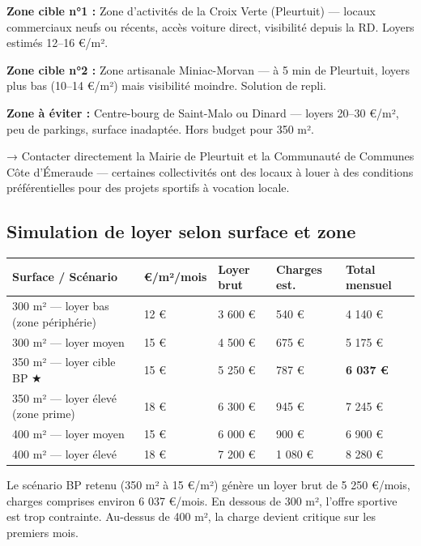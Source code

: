 \documentclass[11pt, a4paper]{article}
\newcommand{\redcell}[1]{\textcolor{fc-red}{\textbf{#1}}}
\newcommand{\posnum}[1]{\textcolor{green!60!black}{#1}}
\begin{document}
\textbf{Zone cible n°1 :} Zone d'activités de la Croix Verte (Pleurtuit) — locaux commerciaux neufs ou récents, accès voiture direct, visibilité depuis la RD. Loyers estimés 12–16 €/m².

\textbf{Zone cible n°2 :} Zone artisanale Miniac-Morvan — à 5 min de Pleurtuit, loyers plus bas (10–14 €/m²) mais visibilité moindre. Solution de repli.

\textbf{Zone à éviter :} Centre-bourg de Saint-Malo ou Dinard — loyers 20–30 €/m², peu de parkings, surface inadaptée. Hors budget pour 350 m².

\begin{tipbox}
→ Contacter directement la Mairie de Pleurtuit et la Communauté de Communes Côte d'Émeraude — certaines collectivités ont des locaux à louer à des conditions préférentielles pour des projets sportifs à vocation locale.
\end{tipbox}

\subsection{Simulation de loyer selon surface et zone}

\begin{center}
\begin{tabular}{@{}p{4.5cm}p{1.8cm}p{2.2cm}p{2.2cm}p{2.5cm}@{}}
\toprule
\rowcolor{fc-ink}\color{white}\textbf{Surface / Scénario} & \color{white}\textbf{€/m²/mois} & \color{white}\textbf{Loyer brut} & \color{white}\textbf{Charges est.} & \color{white}\textbf{Total mensuel} \\
\midrule
300 m² — loyer bas (zone périphérie) & 12 € & 3 600 € & 540 € & \posnum{4 140 €} \\
\rowcolor{fc-bg2} 300 m² — loyer moyen & 15 € & 4 500 € & 675 € & 5 175 € \\
350 m² — loyer cible BP ★ & 15 € & 5 250 € & 787 € & \redcell{6 037 €} \\
\rowcolor{fc-bg2} 350 m² — loyer élevé (zone prime) & 18 € & 6 300 € & 945 € & 7 245 € \\
400 m² — loyer moyen & 15 € & 6 000 € & 900 € & 6 900 € \\
\rowcolor{fc-bg2} 400 m² — loyer élevé & 18 € & 7 200 € & 1 080 € & 8 280 € \\
\bottomrule
\end{tabular}
\end{center}

Le scénario BP retenu (350 m² à 15 €/m²) génère un loyer brut de 5 250 €/mois, charges comprises environ 6 037 €/mois. En dessous de 300 m², l'offre sportive est trop contrainte. Au-dessus de 400 m², la charge devient critique sur les premiers mois.
\end{document}
